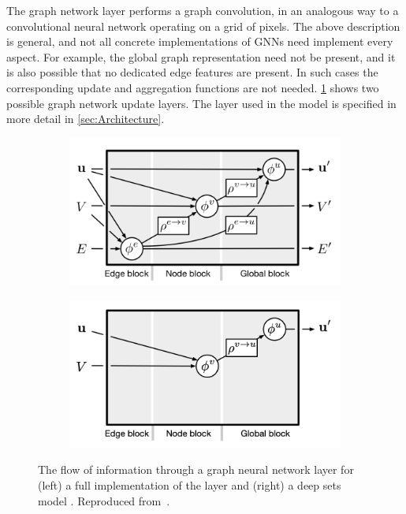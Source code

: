The graph network layer performs a graph convolution, in an analogous way to a convolutional neural network operating on a grid of pixels.
The above description is general, and not all concrete implementations of GNNs need implement every aspect.
For example, the global graph representation need not be present, and it is also possible that no dedicated edge features are present.
In such cases the corresponding update and aggregation functions are not needed.
\cref{fig:gnn_net_diags} shows two possible graph network update layers.
The layer used in the \GNN model is specified in more detail in \cref{sec:Architecture}.


\begin{figure}[!htbp]
    \centering
    \begin{subfigure}[b]{0.48\textwidth}
        \centering
        \includegraphics[width=\textwidth]{chapters/gnn_tagger/figs/gn_full.png}
    \end{subfigure}
    \quad
    \begin{subfigure}[b]{0.48\textwidth}
        \centering
        \includegraphics[width=\textwidth]{chapters/gnn_tagger/figs/gn_deepset.png}
    \end{subfigure}
    \caption{
        The flow of information through a graph neural network layer for (left) a full implementation of the layer and (right) a deep sets model \cite{zaheer2018deep}.
        Reproduced from~.
    }
    \label{fig:gnn_net_diags}
\end{figure}



